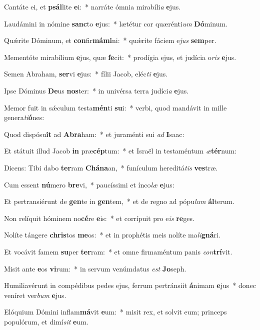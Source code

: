 \item Cantáte ei, et \textbf{psál}lite \textbf{e}i:~* narráte ómnia mirabíli\textit{a} \textbf{e}jus.
\item Laudámini in nómine \textbf{sanc}to \textbf{e}jus:~* lætétur cor quærénti\textit{um} \textbf{Dó}minum.
\item Quǽrite Dóminum, et \textbf{con}fir\textbf{má}\textbf{mi}ni:~* quǽrite fáciem e\textit{jus} \textbf{sem}per.
\item Mementóte mirabílium \textbf{e}jus, quæ \textbf{fe}cit:~* prodígia ejus, et judícia o\textit{ris} \textbf{e}jus.
\item Semen Abraham, \textbf{ser}vi \textbf{e}jus:~* fílii Jacob, eléc\textit{ti} \textbf{e}jus.
\item Ipse Dóminus \textbf{De}us \textbf{nos}ter:~* in univérsa terra judíci\textit{a} \textbf{e}jus.
\item Memor fuit in sǽculum testa\textbf{mén}ti \textbf{su}i:~* verbi, quod mandávit in mille genera\textit{ti}\textbf{ó}nes:
\item Quod dispósu\textbf{it} ad \textbf{A}\textbf{bra}ham:~* et juraménti sui \textit{ad} \textbf{I}saac:
\item Et státuit illud Jacob \textbf{in} præ\textbf{cép}tum:~* et Israël in testaméntum \textit{æ}\textbf{tér}num:
\item Dicens: Tibi dabo \textbf{ter}ram \textbf{Chá}\textbf{na}an,~* funículum hereditá\textit{tis} \textbf{ves}træ.
\item Cum essent \textbf{nú}mero \textbf{bre}vi,~* paucíssimi et ínco\textit{læ} \textbf{e}jus:
\item Et pertransiérunt de \textbf{gen}te in \textbf{gen}tem,~* et de regno ad pópu\textit{lum} \textbf{ál}terum.
\item Non relíquit hóminem no\textbf{cé}re \textbf{e}is:~* et corrípuit pro e\textit{is} \textbf{re}ges.
\item Nolíte tángere \textbf{chris}tos \textbf{me}os:~* et in prophétis meis nolíte ma\textit{li}\textbf{gná}ri.
\item Et vocávit famem \textbf{su}per \textbf{ter}ram:~* et omne firmaméntum panis \textit{con}\textbf{trí}vit.
\item Misit ante \textbf{e}os \textbf{vi}rum:~* in servum venúmdatus \textit{est} \textbf{Jo}seph.
\item Humiliavérunt in compédibus pedes ejus, ferrum pertránsiit \textbf{á}nimam \textbf{e}jus~* donec veníret ver\textit{bum} \textbf{e}jus.
\item Elóquium Dómini inflam\textbf{má}vit \textbf{e}um:~* misit rex, et solvit eum; princeps populórum, et dimí\textit{sit} \textbf{e}um.
